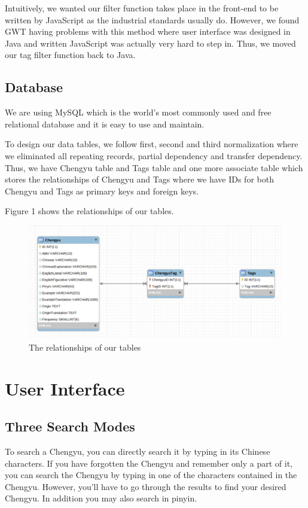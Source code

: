 \documentclass[11pt]{article} %
\begin{document}
Intuitively, we wanted our filter function takes place in the front-end to be written by JavaScript as the industrial standards usually do. However, we found GWT having problems with this method where user interface was designed in Java and written JavaScript was actually very hard to step in. Thus, we moved our tag filter function back to Java. 

\subsection{Database}
\indent We are using MySQL which is the world's most commonly used and free relational database and it is easy to use and maintain.

To design our data tables, we follow first, second and third normalization where we eliminated all repeating records, partial dependency and transfer dependency. Thus, we have Chengyu table and Tags table and one more associate table which stores the relationships of Chengyu and Tags where we have IDs for both Chengyu and Tags as primary keys and foreign keys.

Figure 1 shows the relationships of our tables.

\begin{figure}[htbp]
\begin{center}
\includegraphics[width=15cm]{erd.png}
\caption{The relationships of our tables}
\label{default}
\end{center}
\end{figure}

\section{User Interface}

\subsection{Three Search Modes}
\indent To search a Chengyu, you can directly search it by typing in its Chinese characters. If you have forgotten the Chengyu and remember only a part of it, you can search the Chengyu by typing in one of the characters contained in the Chengyu. However, you'll have to go through the results to find your desired Chengyu. In addition you may also search in pinyin.
\end{document}
